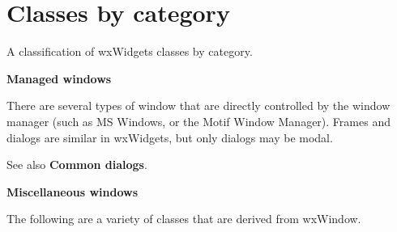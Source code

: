 \chapter{Classes by category}\label{classesbycat}
%
\setfooter{\thepage}{}{}{}{}{\thepage}%

A classification of wxWidgets classes by category.

{\large {\bf Managed windows}}

There are several types of window that are directly controlled by the
window manager (such as MS Windows, or the Motif Window Manager).
Frames and dialogs are similar in wxWidgets, but only dialogs may be modal.

\twocolwidtha{6cm}
\begin{twocollist}\itemsep=0pt
\end{twocollist}

See also {\bf Common dialogs}.

{\large {\bf Miscellaneous windows}}

The following are a variety of classes that are derived from wxWindow.

